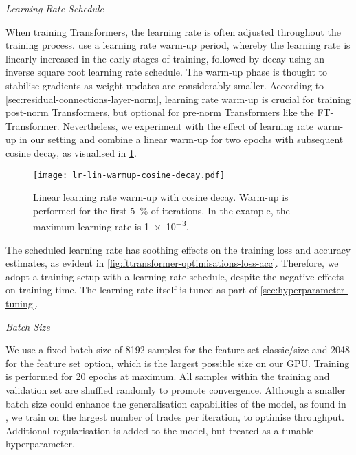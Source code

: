 \emph{Learning Rate Schedule}

When training Transformers, the learning rate is often adjusted throughout the training process. \textcite[][7]{vaswaniAttentionAllYou2017} use a learning rate warm-up period, whereby the learning rate is linearly increased in the early stages of training, followed by decay using an inverse square root learning rate schedule. The warm-up phase is thought to stabilise gradients as weight updates are considerably smaller. According to \cref{sec:residual-connections-layer-norm}, learning rate warm-up is crucial for training post-norm Transformers, but optional for pre-norm Transformers like the FT-Transformer. Nevertheless, we experiment with the effect of learning rate warm-up in our setting and combine a linear warm-up for two epochs with subsequent cosine decay, as visualised in \cref{fig:lr-lin-warmup-cosine-decay}.

\begin{figure}[!ht]
    \centering
    \texttt{[image: lr-lin-warmup-cosine-decay.pdf]}
    \caption[Linear Learning Rate Warm-Up With Cosine Decay]{Linear learning rate warm-up with cosine decay. Warm-up is performed for the first \SI{5}{\percent} of iterations. In the example, the maximum learning rate is \num{1e-3}.}
    \label{fig:lr-lin-warmup-cosine-decay}
\end{figure}

The scheduled learning rate has soothing effects on the training loss and accuracy estimates, as evident in \cref{fig:fttransformer-optimisations-loss-acc}. Therefore, we adopt a training setup with a learning rate schedule, despite the negative effects on training time. The learning rate itself is tuned as part of \cref{sec:hyperparameter-tuning}.


\emph{Batch Size}

We use a fixed batch size of \num{8192} samples for the feature set classic/size and \num{2048} for the feature set option, which is the largest possible size on our \gls{GPU}. Training is performed for \num{20} epochs at maximum. All samples within the training and validation set are shuffled randomly to promote convergence. Although a smaller batch size could enhance the generalisation capabilities of the model, as found in \textcite[][3]{keskarLargeBatchTrainingDeep2017}, we train on the largest number of trades per iteration, to optimise throughput. Additional regularisation is added to the model, but treated as a tunable hyperparameter.

